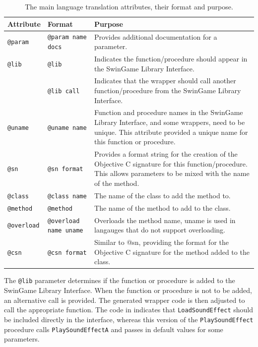 \begin{table}[hbp]
    \footnotesize
    \centering
    \caption{The main language translation attributes, their format and purpose.}
    \label{tbl:attributes}
    \begin{tabular}{l|l|p{8cm}}
    Attribute & Format & Purpose \\
    \hline
    \texttt{@param} & \texttt{@param name docs} & Provides additional documentation for a parameter. \\
    \texttt{@lib} & \texttt{@lib} & Indicates the function/procedure should appear in the SwinGame Library Interface. \\
    ~ & \texttt{@lib call} & Indicates that the wrapper should call another function/procedure from the SwinGame Library Interface. \\
    \texttt{@uname} & \texttt{@uname name} & Function and procedure names in the SwinGame Library Interface, and some wrappers, need to be unique. This attribute provided a unique name for this function or procedure. \\
    \texttt{@sn} & \texttt{@sn format} & Provides a format string for the creation of the Objective C signature for this function/procedure. This allows parameters to be mixed with the name of the method. \\
    \texttt{@class} & \texttt{@class name} & The name of the class to add the method to. \\
    \texttt{@method} & \texttt{@method} & The name of the method to add to the class. \\
    \texttt{@overload} & \texttt{@overload name uname} & Overloads the method name, uname is used in langauges that do not support overloading. \\
    \texttt{@csn} & \texttt{@csn format} & Similar to @sn, providing the format for the Objective C signature for the method added to the class. \\
    \end{tabular}
\end{table}

The \texttt{@lib} parameter determines if the function or procedure is added to the SwinGame Library Interface. When the function or procedure is not to be added, an alternative call is provided. The generated wrapper code is then adjusted to call the appropriate function. The code in  indicates that \texttt{LoadSoundEffect} should be included directly in the interface, whereas this version of the \texttt{PlaySoundEffect} procedure calls \texttt{PlaySoundEffectA} and passes in default values for some parameters.

